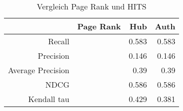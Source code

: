 % 

\begin{frame}[c]

\begin{table}
\begin{tabular}{r|r|r|r}
	 & \textbf{Page Rank} & \textbf{Hub} & \textbf{Auth} \\
	\hline
	Recall 				&  & 0.583 & 0.583 \\
	Precision 			&  & 0.146 & 0.146 \\
	Average Precision 	&  & 0.39  & 0.39  \\
	NDCG 				&  & 0.586 & 0.586 \\
	Kendall tau 		&  & 0.429 & 0.381 \\
\end{tabular}
\caption{Vergleich Page Rank und HITS}
\end{table}

\end{frame}